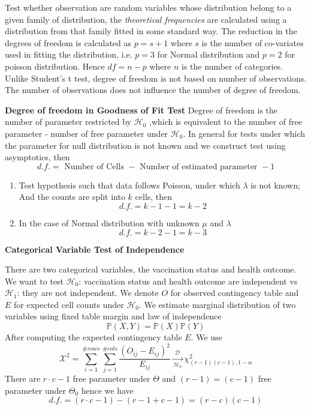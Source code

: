 \documentclass[11pt]{article}
\begin{document}
\begin{example}
  Test whether observation are random variables whose distribution belong to a given family of distribution, the \textit{theoretical frequencies} are calculated using a distribution from that family fitted in some standard way. The reduction in the degrees of freedom is calculated as $p = s+1$ where $s$ is the number of co-variates used in fitting the distribution, i.e. $p = 3$ for Normal distribution and $p=2$ for poisson distribution. Hence $df = n - p$ where $n$ is the number of categories. Unlike Student's t test, degree of freedom is not based on number of observations. The number of observations does not influence the number of degree of freedom.
\end{example}


\begin{defn*}
  \textbf{Degree of freedom in Goodness of Fit Test} Degree of freedom is the number of parameter restricted by $\mathcal{H}_0$ ,which is equivalent to the number of free parameter - number of free parameter under $\mathcal{H}_0$. In general for tests under which the parameter for null distribution is not known and we construct test using asymptotics, then
  \[
    d.f. = \text{ Number of Cells } - \text{ Number of estimated parameter } - 1
  \]
  \begin{enumerate}
    \item Test hypothesis such that data follows Poisson, under which $\lambda$ is not known; And the counts are split into $k$ cells, then
    \[
      d.f. = k - 1 - 1 = k-2
    \]
    \item In the case of Normal distribution with unknown $\mu$ and $\lambda$
    \[
      d.f. = k - 2 - 1 = k-3
    \]
  \end{enumerate}
\end{defn*}


\begin{defn*}
  \textbf{Categorical Variable Test of Independence}
\end{defn*}


\begin{example}
  There are two categorical variables, the vaccination status and health outcome. We want to test $\mathcal{H}_0$: vaccination status and health outcome are independent vs $\mathcal{H}_1$: they are not independent. We denote $O$ for observed contingency table and $E$ for expected cell counts under $\mathcal{H}_0$. We estimate marginal distribution of two variables using fixed table margin and law of independence
  \[
    \mathbb{P}(X, Y) = \mathbb{P}(X) \mathbb{P}(Y)
  \]
  After computing the expected contingency table $E$. We use
  \[
    \mathcal{X}^2 = \sum_{i=1}^{\#rows} \sum_{j=1}^{\#cols} \frac{(O_{ij} - E_{ij})^2}{E_{ij}}  \xrightarrow[\mathcal{H}_0]{\mathcal{D}} \chi_{(r-1)(c-1), 1-\alpha}^2
  \]
  There are $r\cdot c - 1$ free parameter under $\Theta$ and $(r-1) = (c-1)$ free parameter under $\Theta_0$ hence we have
  \[
    d.f. = (r\cdot c - 1) - (r-1 + c-1) = (r-c)(c-1)
  \]
\end{example}
\end{document}
